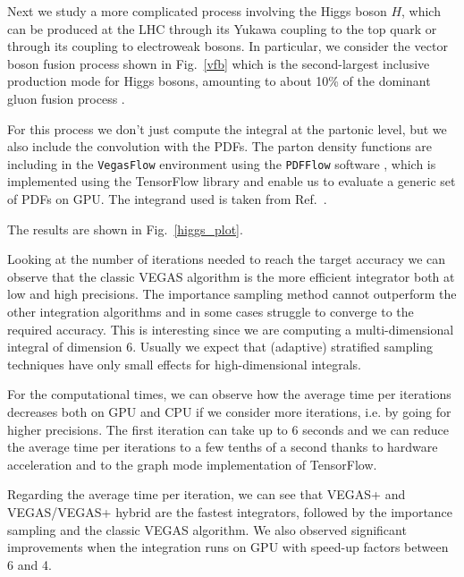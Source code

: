\documentclass[../main/main.tex]{subfiles}
\begin{document}
Next we study a more complicated process involving the Higgs boson $H$, which can be produced at the LHC through its Yukawa coupling to the top quark or through its coupling to electroweak bosons. In particular, we consider the vector boson fusion process shown in Fig.~\ref{vfb} which is the second-largest inclusive production mode for Higgs bosons, amounting to about 10\% of the dominant gluon fusion process \cite{Cruz_Martinez_2018}.

For this process we don't just compute the integral at the partonic level, but we also include the convolution with the PDFs. 
The parton density functions are including in the \texttt{VegasFlow} environment using the \texttt{PDFFlow} software \cite{Carrazza_2021,juan_m_cruz_martinez_2021_4903010}, which is implemented using the TensorFlow library and enable us to evaluate a generic set of PDFs on GPU. 
The integrand used is taken from Ref.~\cite{juan_m_cruz_martinez_2021_4903010}.

The results are shown in Fig.~\ref{higgs_plot}.

Looking at the number of iterations needed to reach the target accuracy we can observe that the classic VEGAS algorithm is the more efficient integrator both at low and high precisions. The importance sampling method cannot outperform the other integration algorithms and in some cases struggle to converge to the required accuracy. This is interesting since we are computing a multi-dimensional integral of dimension 6. Usually we expect that (adaptive) stratified sampling techniques have only small effects for high-dimensional integrals.

For the computational times, we can observe how the average time per iterations decreases both on GPU and CPU if we consider more iterations, i.e. by going for higher precisions. The first iteration can take up to 6 seconds and we can reduce the average time per iterations to a few tenths of a second thanks to hardware acceleration and to the graph mode implementation of TensorFlow.

Regarding the average time per iteration, we can see that VEGAS+ and VEGAS/VEGAS+ hybrid are the fastest integrators, followed by the importance sampling and the classic VEGAS algorithm. We also observed significant improvements when the integration runs on GPU with speed-up factors between 6 and 4.

 
\end{document}
